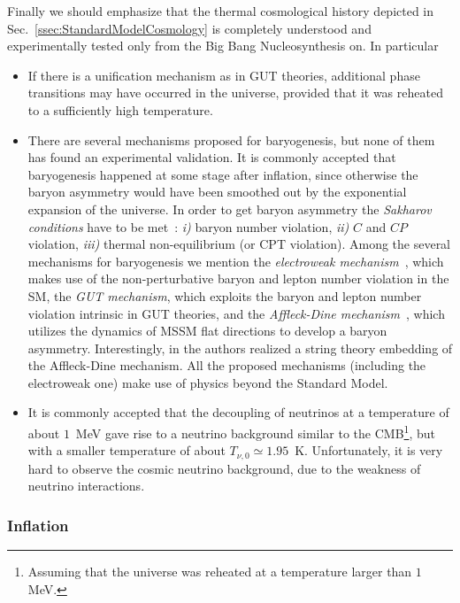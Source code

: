\documentclass[12pt,a4paper]{book}
\newcommand{\bi}{\begin{itemize}}
\newcommand{\ei}{\end{itemize}}
\begin{document}
Finally we should emphasize that the thermal cosmological history depicted in Sec.~\ref{ssec:StandardModelCosmology} is completely understood and experimentally tested only from the Big Bang Nucleosynthesis on. In particular
\bi
\item If there is a unification mechanism as in GUT theories, additional phase transitions may have occurred in the universe, provided that it was reheated to a sufficiently high temperature.
\item There are several mechanisms proposed for baryogenesis, but none of them has found an experimental validation. It is commonly accepted that baryogenesis happened at some stage after inflation, since otherwise the baryon asymmetry would have been smoothed out by the exponential expansion of the universe. In order to get baryon asymmetry the \textit{Sakharov conditions} have to be met~\cite{Sakharov:1967dj}: \textit{i)} baryon number violation, \textit{ii)} $C$ and $CP$ violation, \textit{iii)} thermal non-equilibrium (or CPT violation). Among the several mechanisms for baryogenesis we mention the \textit{electroweak mechanism}~\cite{Rubakov:2002fi, Kuzmin:1985mm, Kolb:1990vq}, which makes use of the non-perturbative baryon and lepton number violation in the SM, the \textit{GUT mechanism}, which exploits the baryon and lepton number violation intrinsic in GUT theories, and the \textit{Affleck-Dine mechanism}~\cite{Affleck:1984fy}, which utilizes the dynamics of MSSM flat directions to develop a baryon asymmetry. Interestingly, in \cite{ADB} the authors realized a string theory embedding of the Affleck-Dine mechanism. All the proposed mechanisms (including the electroweak one) make use of physics beyond the Standard Model.
\item It is commonly accepted that the decoupling of neutrinos at a temperature of about $1 \,$ MeV gave rise to a neutrino background similar to the CMB\footnote{Assuming that the universe was reheated at a temperature larger than $1\,$ MeV.}, but with a smaller temperature of about $T_{\nu, 0} \simeq 1.95 \,$ K. Unfortunately, it is very hard to observe the cosmic neutrino background, due to the weakness of neutrino interactions.
\ei

\subsubsection{Inflation}
\label{sssec:Inflation}
\end{document}
